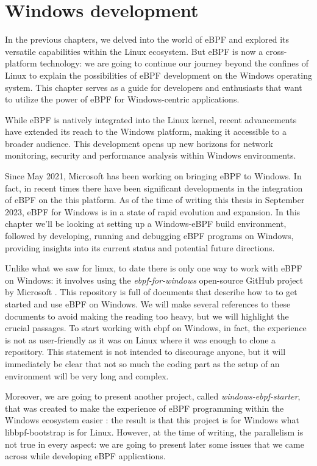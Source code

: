 \chapter{Windows development}

In the previous chapters, we delved into the world of eBPF and explored its versatile capabilities within the Linux ecosystem.
But eBPF is now a cross-platform technology: we are going to continue our journey beyond the confines of Linux to explain the possibilities of eBPF development on the Windows operating system. 
This chapter serves as a guide for developers and enthusiasts that want to utilize the power of eBPF for Windows-centric applications.

While eBPF is natively integrated into the Linux kernel, recent advancements have extended its reach to the Windows platform, making it accessible to a broader audience. 
This development opens up new horizons for network monitoring, security and performance analysis within Windows environments.

Since May 2021, Microsoft has been working on bringing eBPF to Windows. 
In fact, in recent times there have been significant developments in the integration of eBPF on the this platform. 
As of the time of writing this thesis in September 2023, eBPF for Windows is in a state of rapid evolution and expansion. 
In this chapter we’ll be looking at setting up a Windows-eBPF build environment, followed by developing, running and debugging eBPF programs on Windows, providing insights into its current status and potential future directions. 

Unlike what we saw for linux, to date there is only one way to work with eBPF on Windows: it involves using the \textit{ebpf-for-windows} open-source GitHub project by Microsoft \cite{eBPFWinGitHubRepo}.
This repository is full of documents that describe how to to get started and use eBPF on Windows.
We will make several references to these documents to avoid making the reading too heavy, but we will highlight the crucial passages.
To start working with ebpf on Windows, in fact, the experience is not as user-friendly as it was on Linux where it was enough to clone a repository.
This statement is not intended to discourage anyone, but it will immediately be clear that not so much the coding part as the setup of an environment will be very long and complex.

Moreover, we are going to present another project, called \textit{windows-ebpf-starter}, that was created to make the experience of eBPF programming within the Windows ecosystem easier \cite{WineBPFStarterRepo}: the result is that this project is for Windows what libbpf-bootstrap is for Linux.
However, at the time of writing, the parallelism is not true in every aspect: we are going to present later some issues that we came across while developing eBPF applications.

